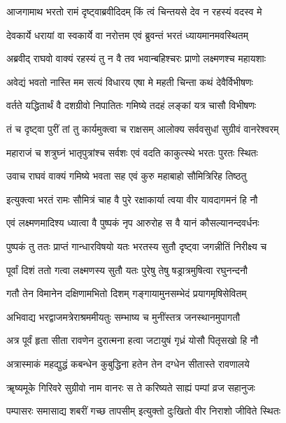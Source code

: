 \twolineshloka
{आजगामाथ भरतो रामं दृष्ट्वाब्रवीदिदम्}
{किं त्वं चिन्तयसे देव न रहस्यं वदस्व मे}%

\twolineshloka
{देवकार्ये धरायां वा स्वकार्ये वा नरोत्तम}
{एवं ब्रुवन्तं भरतं ध्यायमानमवस्थितम्}%

\twolineshloka
{अब्रवीद् राघवो वाक्यं रहस्यं तु न वै तव}
{भवान्बहिश्चरः प्राणो लक्ष्मणश्च महायशाः}%

\twolineshloka
{अवेद्यं भवतो नास्ति मम सत्यं विधारय}
{एषा मे महती चिन्ता कथं देवैर्विभीषणः}%

\twolineshloka
{वर्तते यद्धितार्थं वै दशग्रीवो निपातितः}
{गमिष्ये तदहं लङ्कां यत्र चासौ विभीषणः}%

\twolineshloka
{तं च दृष्ट्वा पुरीं तां तु कार्यमुक्त्वा च राक्षसम्}
{आलोक्य सर्ववसुधां सुग्रीवं वानरेश्वरम्}%

\twolineshloka
{महाराजं च शत्रुघ्नं भातृपुत्रांश्च सर्वशः}
{एवं वदति काकुत्स्थे भरतः पुरतः स्थितः}%

\twolineshloka
{उवाच राघवं वाक्यं गमिष्ये भवता सह}
{एवं कुरु महाबाहो सौमित्रिरिह तिष्ठतु}%

\twolineshloka
{इत्युक्त्वा भरतं रामः सौमित्रं चाह वै पुरे}
{रक्षाकार्या त्वया वीर यावदागमनं हि नौ}%

\twolineshloka
{एवं लक्ष्मणमादिश्य ध्यात्वा वै पुष्पकं नृप}
{आरुरोह स वै यानं कौसल्यानन्दवर्धनः}%

\twolineshloka
{पुष्पकं तु ततः प्राप्तं गान्धारविषयो यतः}
{भरतस्य सुतौ दृष्ट्वा जगन्नीतिं निरीक्ष्य च}%

\twolineshloka
{पूर्वां दिशं ततो गत्वा लक्ष्मणस्य सुतौ यतः}
{पुरेषु तेषु षड्रात्रमुषित्वा रघुनन्दनौ}%

\twolineshloka
{गतौ तेन विमानेन दक्षिणामभितो दिशम्}
{गङ्गायामुनसम्भेदं प्रयागमृषिसेवितम्}%

\twolineshloka
{अभिवाद्य भरद्वाजमत्रेराश्रममीयतुः}
{सम्भाष्य च मुनींस्तत्र जनस्थानमुपागतौ}%


\twolineshloka
{अत्र पूर्वं हृता सीता रावणेन दुरात्मना}
{हत्वा जटायुषं गृध्रं योसौ पितृसखो हि नौ}%

\twolineshloka
{अत्रास्माकं महद्युद्धं कबन्धेन कुबुद्धिना}
{हतेन तेन दग्धेन सीतास्ते रावणालये}%

\twolineshloka
{ॠष्यमूके गिरिवरे सुग्रीवो नाम वानरः}
{स ते करिष्यते साह्यं पम्पां व्रज सहानुजः}%

\twolineshloka
{पम्पासरः समासाद्य शबरीं गच्छ तापसीम्}
{इत्युक्तो दुःखितो वीर निराशो जीविते स्थितः}%

